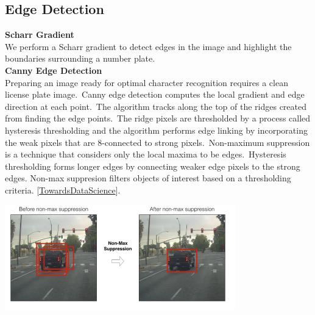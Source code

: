 \documentclass[a4paper,twoside,10pt]{report}
\begin{document}
\subsection{Edge Detection}
\textbf{Scharr Gradient}\\
We perform a Scharr gradient to detect edges in the image and highlight the boundaries surrounding a number plate. \\[3pt]
\textbf{Canny Edge Detection}\\
Preparing an image ready for optimal character recognition requires a clean license plate image.\
Canny edge detection computes the local gradient and edge direction at each point.\
The algorithm tracks along the top of the ridges created from finding the edge points.\
The ridge pixels are thresholded by a process called hysteresis thresholding and the algorithm performs edge linking by incorporating the weak pixels that are 8-connected to strong pixels.\
Non-maximum suppression is a technique that considers only the local maxima to be edges.\
Hysteresis thresholding forms longer edges by connecting weaker edge pixels to the strong edges.
Non-max suppresion filters objects of interest based on a thresholding criteria. [\href{https://towardsdatascience.com/non-maximum-suppression-nms-93ce178e177c}{TowardsDataScience}].
\begin{center}
  \includegraphics[width=10cm]{images/Non-maximum Suppression.png}
\end{center}
\end{document}
